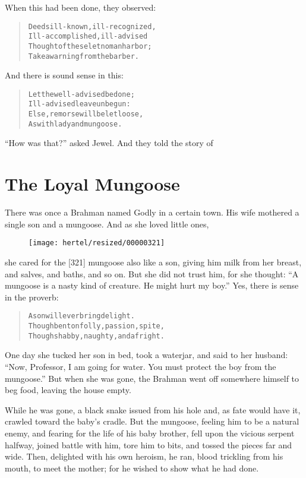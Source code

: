 \documentclass[article, twoside, 10pt]{memoir}
\renewenvironment{verbatim}{%
\begin{quote}%
\vskip -10pt%
\begin{alltt}\normalfont\small}{\end{alltt}%
\end{quote}%
\vskip -10pt
} %
\begin{document}
When this had been done, they observed:

\begin{verbatim}
Deeds ill-known, ill-recognized,
Ill-accomplished, ill-advised{\textemdash}
Thought of these let no man harbor;
Take a warning from the barber.
\end{verbatim}
And there is sound sense in this:

\begin{verbatim}
Let the well-advised be done;
Ill-advised leave unbegun:
Else, remorse will be let loose,
As with lady and mungoose.
\end{verbatim}
``How was that?'' asked Jewel. And they told the story of

\chapter{The Loyal Mungoose}

There was once a Brahman named Godly in a certain town. His wife
mothered a single son and a mungoose. And as she loved little ones,
\begin{figure}[p]\texttt{[image: hertel/resized/00000321]}\end{figure}she cared for the [321] mungoose also like a son, giving him milk
from her breast, and salves, and baths, and so on. But she did not
trust him, for she thought:
``A mungoose is a nasty kind of creature. He might hurt my boy.''
Yes, there is sense in the proverb:

\begin{verbatim}
A son will ever bring delight.
Though bent on folly, passion, spite,
Though shabby, naughty, and a fright.
\end{verbatim}
One day she tucked her son in bed, took a waterjar, and said to her
husband:
``Now, Professor, I am going for water. You must protect the boy from the mungoose.''
But when she was gone, the Brahman went off somewhere himself to
beg food, leaving the house empty.

While he was gone, a black snake issued from his hole and, as fate
would have it, crawled toward the baby's cradle. But the mungoose,
feeling him to be a natural enemy, and fearing for the life of his
baby brother, fell upon the vicious serpent halfway, joined battle
with him, tore him to bits, and tossed the pieces far and wide.
Then, delighted with his own heroism, he ran, blood trickling from
his mouth, to meet the mother; for he wished to show what he had
done.
\end{document}
